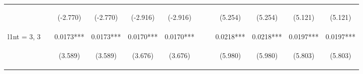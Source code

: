 \documentclass[]{article}
\begin{document}
\begin{center}
\begin{tabular}{lccccccccccc}
\vspace{4pt} & \begin{footnotesize}\end{footnotesize} & \begin{footnotesize}(-2.770)\end{footnotesize} & \begin{footnotesize}(-2.770)\end{footnotesize} & \begin{footnotesize}(-2.916)\end{footnotesize} & \begin{footnotesize}(-2.916)\end{footnotesize} & \begin{footnotesize}\end{footnotesize} & \begin{footnotesize}\end{footnotesize} & \begin{footnotesize}(5.254)\end{footnotesize} & \begin{footnotesize}(5.254)\end{footnotesize} & \begin{footnotesize}(5.121)\end{footnotesize} & \begin{footnotesize}(5.121)\end{footnotesize} \\
l1nt = 3, 3 &  & 0.0173*** & 0.0173*** & 0.0170*** & 0.0170*** &  &  & 0.0218*** & 0.0218*** & 0.0197*** & 0.0197*** \\
\vspace{4pt} & \begin{footnotesize}\end{footnotesize} & \begin{footnotesize}(3.589)\end{footnotesize} & \begin{footnotesize}(3.589)\end{footnotesize} & \begin{footnotesize}(3.676)\end{footnotesize} & \begin{footnotesize}(3.676)\end{footnotesize} & \begin{footnotesize}\end{footnotesize} & \begin{footnotesize}\end{footnotesize} & \begin{footnotesize}(5.980)\end{footnotesize} & \begin{footnotesize}(5.980)\end{footnotesize} & \begin{footnotesize}(5.803)\end{footnotesize} & \begin{footnotesize}(5.803)\end{footnotesize} \\

\end{tabular}
\end{center}
\end{document}
